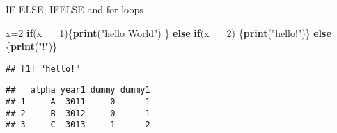 \documentclass[ignorenonframetext,]{beamer}
\newenvironment{Shaded}{\begin{snugshade}}{\end{snugshade}}
\newcommand{\ControlFlowTok}[1]{\textcolor[rgb]{0.13,0.29,0.53}{\textbf{#1}}}
\newcommand{\DecValTok}[1]{\textcolor[rgb]{0.00,0.00,0.81}{#1}}
\newcommand{\KeywordTok}[1]{\textcolor[rgb]{0.13,0.29,0.53}{\textbf{#1}}}
\newcommand{\NormalTok}[1]{#1}
\newcommand{\OperatorTok}[1]{\textcolor[rgb]{0.81,0.36,0.00}{\textbf{#1}}}
\newcommand{\OtherTok}[1]{\textcolor[rgb]{0.56,0.35,0.01}{#1}}
\newcommand{\StringTok}[1]{\textcolor[rgb]{0.31,0.60,0.02}{#1}}
\begin{document}
\begin{frame}[fragile]{IF ELSE, IFELSE and for loops}
\protect\hypertarget{if-else-ifelse-and-for-loops}{}

\begin{Shaded}
\begin{Highlighting}[]
\NormalTok{x=}\DecValTok{2}
\ControlFlowTok{if}\NormalTok{(x}\OperatorTok{==}\DecValTok{1}\NormalTok{)\{}\KeywordTok{print}\NormalTok{(}\StringTok{"hello World"}\NormalTok{) \} }\ControlFlowTok{else} \ControlFlowTok{if}\NormalTok{(x}\OperatorTok{==}\DecValTok{2}\NormalTok{) }
\NormalTok{  \{}\KeywordTok{print}\NormalTok{(}\StringTok{"hello!"}\NormalTok{)\} }\ControlFlowTok{else}\NormalTok{ \{}\KeywordTok{print}\NormalTok{(}\StringTok{"!"}\NormalTok{)\}}
\end{Highlighting}
\end{Shaded}

\begin{verbatim}
## [1] "hello!"
\end{verbatim}

\begin{Shaded}
\end{Shaded}

\begin{verbatim}
##   alpha year1 dummy dummy1
## 1     A  3011     0      1
## 2     B  3012     0      1
## 3     C  3013     1      2
\end{verbatim}

\end{frame}
\end{document}
